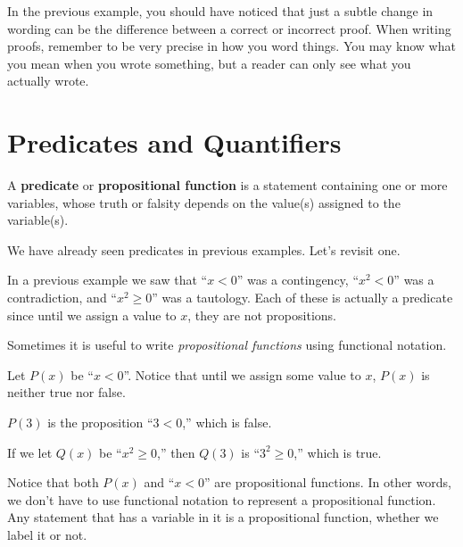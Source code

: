 In the previous example, you should have noticed that just a subtle change in wording can be the difference between
a correct or incorrect proof.  When writing proofs, remember to be very precise in how you word things.
You may know what you mean when you wrote something, but a reader can only see what you actually wrote.

\newpage
\section{Predicates and Quantifiers}\label{section:pred}
\begin{df}
A {\bf predicate} or {\bf propositional function} is a statement containing one or more variables, 
whose truth or falsity depends on the value(s) assigned to the variable(s).
\end{df}

We have already seen predicates in previous examples.  Let's revisit one.

\begin{exa}
In a previous example we saw that ``$x<0$'' was a contingency, ``$x^2<0$'' was a contradiction, and ``$x^2\geq 0$''
was a tautology.  Each of these is actually a predicate since until we assign a value to $x$,
they are not propositions.  
\end{exa}
Sometimes it is useful to write {\em propositional functions} using functional notation.
\begin{exa}
Let $P(x)$ be ``$x<0$''.  Notice that until we assign some value to $x$, $P(x)$ is neither true nor false.

$P(3)$ is the proposition ``$3<0$,'' which is false.

If we let $Q(x)$ be ``$x^2\geq 0$,'' then $Q(3)$ is ``$3^2\geq 0$,'' which is true.  
\end{exa}

Notice that both $P(x)$ and ``$x<0$'' are propositional functions.  In other words, we don't have to use functional
notation to represent a propositional function.  Any statement that has a variable in it is a propositional function,
whether we label it or not.

